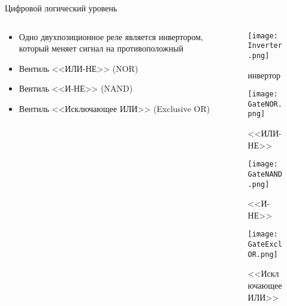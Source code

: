 \documentclass[aspectratio=169,14pt]{beamer}
\begin{document}
\begin{frame}{Цифровой логический уровень}
    \begin{columns}[T,onlytextwidth]
        \begin{column}{0.5\textwidth}
            \begin{itemize}
                \item Одно двухпозиционное реле является инвертором, который меняет сигнал на противоположный
                \item Вентиль <<ИЛИ-НЕ>> (NOR)
                \item Вентиль <<И-НЕ>> (NAND)
                \item Вентиль <<Исключающее ИЛИ>> (Exclusive OR)
            \end{itemize}
        \end{column}
        \begin{column}{0.5\textwidth}
            \begin{figure}[htp]
                \vspace{-25pt}
                \centering
                \texttt{[image: Inverter.png]}
                \captionsetup{skip=0pt}
                \caption{\tiny{инвертор}}
                \label{fig:Inverter}
            \end{figure}
            \begin{figure}[htp]
                \vspace{-25pt}
                \centering
                \texttt{[image: GateNOR.png]}
                \caption{\tiny{<<ИЛИ-НЕ>>}}
                \label{fig:GateNOR}
            \end{figure}
            \begin{figure}[htp]
                \vspace{-25pt}
                \centering
                \texttt{[image: GateNAND.png]}
                \caption{\tiny{<<И-НЕ>>}}
                \label{fig:GateNAND}
            \end{figure}
            \begin{figure}[htp]
                \vspace{-25pt}
                \centering
                \texttt{[image: GateExclOR.png]}
                \caption{\tiny{<<Исключающее ИЛИ>>}}
                \label{fig:GateExclOR}
            \end{figure}
        \end{column}
    \end{columns}
\end{frame}
\end{document}
